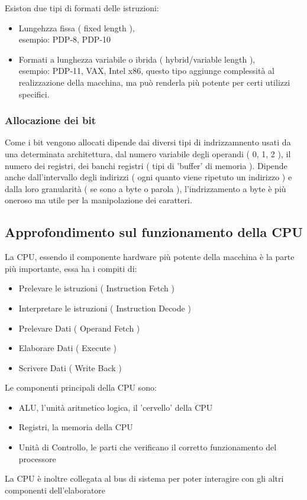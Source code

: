 \documentclass[arch.tex]{subfiles}
\begin{document}
Esiston due tipi di formati delle istruzioni:
\begin{itemize}
	\item Lungehzza fissa ( fixed length ),\\
		esempio: PDP-8, PDP-10
	\item Formati a lunghezza variabile o ibrida ( hybrid/variable length ),\\
		esempio: PDP-11, VAX, Intel x86, questo tipo aggiunge complessità
		al realizzazione della macchina, ma può renderla più potente per certi 
		utilizzi specifici.
\end{itemize}

\subsubsection{Allocazione dei bit}
Come i bit vengono allocati dipende dai diversi tipi di indrizzamnento usati da una determinata
architettura, dal numero variabile degli operandi ( 0, 1, 2 ),
il numero dei registri, dei banchi registri ( tipi di 'buffer' di memoria ).
Dipende anche dall'intervallo degli indirizzi ( ogni quanto viene ripetuto un indirizzo ) e dalla
loro granularità ( se sono a byte o parola ), l'indrizzamento a byte è più oneroso
ma utile per la manipolazione dei caratteri.

\subsection{Approfondimento sul funzionamento della CPU}%
\label{sub:approfondimento_sul_funzionamento_della_cpu}

La CPU, essendo il componente hardware più potente della macchina è la parte più importante,
essa ha i compiti di:

\begin{itemize}
	\item Prelevare le istruzioni ( Instruction Fetch )
	\item Interpretare le istruzioni ( Instruction Decode ) 
	\item Prelevare Dati ( Operand Fetch ) 
	\item Elaborare Dati ( Execute ) 
	\item Scrivere Dati ( Write Back ) 
\end{itemize}
Le componenti principali della CPU sono:

\begin{itemize}
	\item ALU, l'unità aritmetico logica, il 'cervello' della CPU
	\item Registri, la memoria della CPU
	\item Unità di Controllo, le parti che verificano il corretto funzionamento del
		processore
\end{itemize}
La CPU è inoltre collegata al bus di sistema per poter interagire con gli altri componenti 
dell'elaboratore
\end{document}
